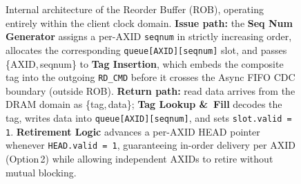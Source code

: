 \documentclass[10pt]{article}
\begin{document}
\begin{figure}[H]

\caption{%
  Internal architecture of the Reorder Buffer (ROB), operating entirely
  within the client clock domain.
  \textbf{Issue path:} the \textbf{Seq Num Generator} assigns a per-AXID
  \texttt{seqnum} in strictly increasing order, allocates the corresponding
  \texttt{queue[AXID][seqnum]} slot, and passes \{AXID,\,seqnum\} to
  \textbf{Tag Insertion}, which embeds the composite tag into the outgoing
  \texttt{RD\_CMD} before it crosses the Async FIFO CDC boundary (outside ROB).
  \textbf{Return path:} read data arrives from the DRAM domain as
  \{tag,\,data\}; \textbf{Tag Lookup \&\ Fill} decodes the tag, writes data
  into \texttt{queue[AXID][seqnum]}, and sets \texttt{slot.valid\,=\,1}.
  \textbf{Retirement Logic} advances a per-AXID HEAD pointer whenever
  \texttt{HEAD.valid\,=\,1}, guaranteeing in-order delivery per AXID
  (Option\,2) while allowing independent AXIDs to retire without mutual blocking.}
\label{fig:rob}
\end{figure}
\end{document}
